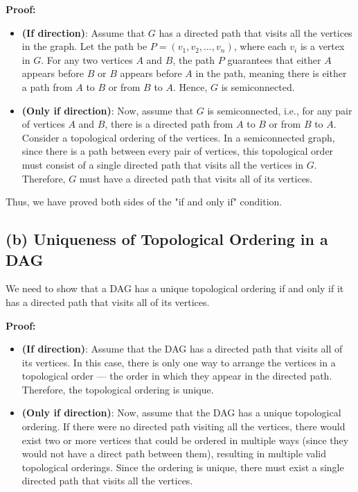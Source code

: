 \documentclass[11pt]{article}
\begin{document}
\textbf{Proof:}

\begin{itemize}
    \item \textbf{(If direction)}: 
    Assume that \( G \) has a directed path that visits all the vertices in the graph. Let the path be \( P = (v_1, v_2, \dots, v_n) \), where each \( v_i \) is a vertex in \( G \). 
    For any two vertices \( A \) and \( B \), the path \( P \) guarantees that either \( A \) appears before \( B \) or \( B \) appears before \( A \) in the path, meaning there is either a path from \( A \) to \( B \) or from \( B \) to \( A \). 
    Hence, \( G \) is semiconnected.

    \item \textbf{(Only if direction)}: 
    Now, assume that \( G \) is semiconnected, i.e., for any pair of vertices \( A \) and \( B \), there is a directed path from \( A \) to \( B \) or from \( B \) to \( A \). 
    Consider a topological ordering of the vertices. In a semiconnected graph, since there is a path between every pair of vertices, this topological order must consist of a single directed path that visits all the vertices in \( G \).
    Therefore, \( G \) must have a directed path that visits all of its vertices.
\end{itemize}

Thus, we have proved both sides of the "if and only if" condition.

\subsection*{(b) Uniqueness of Topological Ordering in a DAG}

We need to show that a DAG has a unique topological ordering if and only if it has a directed path that visits all of its vertices.

\textbf{Proof:}

\begin{itemize}
    \item \textbf{(If direction)}: 
    Assume that the DAG has a directed path that visits all of its vertices. 
    In this case, there is only one way to arrange the vertices in a topological order — the order in which they appear in the directed path. Therefore, the topological ordering is unique.

    \item \textbf{(Only if direction)}: 
    Now, assume that the DAG has a unique topological ordering. 
    If there were no directed path visiting all the vertices, there would exist two or more vertices that could be ordered in multiple ways (since they would not have a direct path between them), resulting in multiple valid topological orderings. 
    Since the ordering is unique, there must exist a single directed path that visits all the vertices.
\end{itemize}
\end{document}
